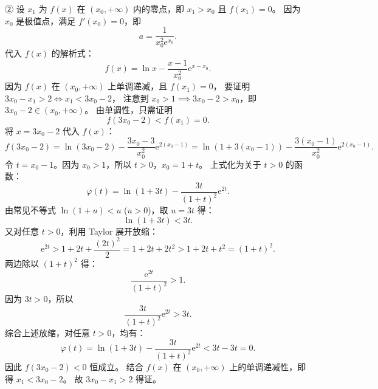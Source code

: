 \begin{answer}
② 设 $x_1$ 为 $f(x)$ 在 $(x_0, +\infty)$ 内的零点，即 $x_1 > x_0$ 且 $f(x_1) = 0$。
因为 $x_0$ 是极值点，满足 $f'(x_0) = 0$，即
\nopagebreak[4]
\[a = \frac{1}{x_0^2\mathrm{e}^{x_0}}.\]
代入 $f(x)$ 的解析式：
\nopagebreak[4]
\[f(x) = \ln x - \frac{x - 1}{x_0^2}\mathrm{e}^{x - x_0}.\]
因为 $f(x)$ 在 $(x_0, +\infty)$ 上单调递减，且 $f(x_1) = 0$，
要证明 $3x_0 - x_1 > 2 \iff x_1 < 3x_0 - 2$，
注意到 $x_0 > 1 \implies 3x_0 - 2 > x_0$，即 $3x_0 - 2 \in (x_0, +\infty)$。
由单调性，只需证明
\nopagebreak[4]
\[f(3x_0 - 2) < f(x_1) = 0.\]
将 $x = 3x_0 - 2$ 代入 $f(x)$：
\nopagebreak[4]
\[f(3x_0 - 2) = \ln(3x_0 - 2) - \frac{3x_0 - 3}{x_0^2}\mathrm{e}^{2(x_0 - 1)} = \ln(1 + 3(x_0 - 1)) - \frac{3(x_0 - 1)}{x_0^2}\mathrm{e}^{2(x_0 - 1)}.\]
令 $t = x_0 - 1$。因为 $x_0 > 1$，所以 $t > 0$，$x_0 = 1 + t$。
上式化为关于 $t > 0$ 的函数：
\nopagebreak[4]
\[\varphi(t) = \ln(1 + 3t) - \frac{3t}{(1 + t)^2}\mathrm{e}^{2t}.\]
由常见不等式 $\ln(1 + u) < u$ ($u > 0$)，取 $u = 3t$ 得：
\nopagebreak[4]
\[\ln(1 + 3t) < 3t.\]
又对任意 $t > 0$，利用 Taylor 展开放缩：
\nopagebreak[4]
\[\mathrm{e}^{2t} > 1 + 2t + \frac{(2t)^2}{2} = 1 + 2t + 2t^2 > 1 + 2t + t^2 = (1 + t)^2.\]
两边除以 $(1 + t)^2$ 得：
\nopagebreak[4]
\[\frac{\mathrm{e}^{2t}}{(1 + t)^2} > 1.\]
因为 $3t > 0$，所以
\nopagebreak[4]
\[\frac{3t}{(1 + t)^2}\mathrm{e}^{2t} > 3t.\]
综合上述放缩，对任意 $t > 0$，均有：
\nopagebreak[4]
\[\varphi(t) = \ln(1 + 3t) - \frac{3t}{(1 + t)^2}\mathrm{e}^{2t} < 3t - 3t = 0.\]
因此 $f(3x_0 - 2) < 0$ 恒成立。
结合 $f(x)$ 在 $(x_0, +\infty)$ 上的单调递减性，即得 $x_1 < 3x_0 - 2$。
故 $3x_0 - x_1 > 2$ 得证。



\end{answer}